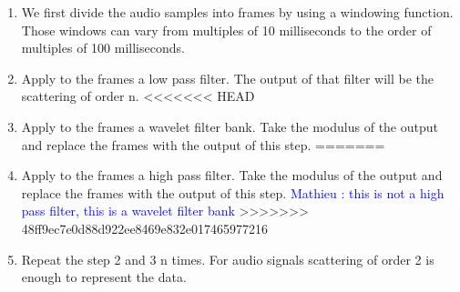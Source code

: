 \documentclass[hidelinks,12pt]{report}
\newcommand{\ml}[1]{\textcolor{blue}{ Mathieu : #1}}
\begin{document}
\begin{enumerate}
\item We first divide the audio samples into frames by using a windowing function. Those windows can vary from multiples of 10 milliseconds to the order of multiples of 100 milliseconds.  
\item Apply to the frames a low pass filter. The output of that filter will be the scattering of order n.
<<<<<<< HEAD
\item Apply to the frames a wavelet filter bank. Take the modulus of the output and replace the frames with the output of this step.
=======
\item Apply to the frames a high pass filter. Take the modulus of the output and replace the frames with the output of this step. \ml{this is not a high pass filter, this is a wavelet filter bank}
>>>>>>> 48ff9ec7e0d88d922ee8469e832e017465977216
\item Repeat the step 2 and 3 n times. For audio signals scattering of order 2 is enough to represent the data.
\end{enumerate}
\end{document}
